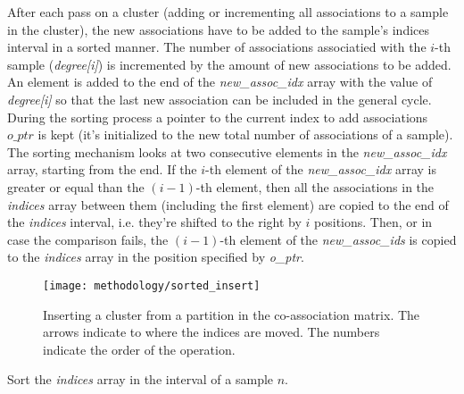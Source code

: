 After each pass on a cluster (adding or incrementing all associations to a sample in the cluster), the new associations have to be added to the sample's indices interval in a sorted manner.
The number of associations associatied with the $i$-th sample (\emph{degree[i]}) is incremented by the amount of new associations to be added.
An element is added to the end of the \emph{new\_assoc\_idx} array with the value of \emph{degree[i]} so that the last new association can be included in the general cycle.
During the sorting process a pointer to the current index to add associations $o\_ptr$ is kept (it's initialized to the new total number of associations of a sample).
The sorting mechanism looks at two consecutive elements in the \emph{new\_assoc\_idx} array, starting from the end.
If the $i$-th element of the \emph{new\_assoc\_idx} array is greater or equal than the $(i-1)$-th element, then all the associations in the \emph{indices} array between them (including the first element) are copied to the end of the \emph{indices} interval, i.e. they're shifted to the right by $i$ positions.
Then, or in case the comparison fails, the $(i-1)$-th element of the \emph{new\_assoc\_ids} is copied to the \emph{indices} array in the position specified by \emph{o\_ptr}.


\begin{figure}[hbtp]
\centering
\texttt{[image: methodology/sorted\_insert]}
\caption{Inserting a cluster from a partition in the co-association matrix. The arrows indicate to where the indices are moved. The numbers indicate the order of the operation.}
\label{fig:normal part}
\end{figure}



\begin{algorithm}
\caption{Sort the \emph{indices} array in the interval of a sample $n$.}\label{alg:eac csr sort cluster}
\begin{algorithmic}[1]

    \EndWhile
\EndWhile

\EndProcedure
\end{algorithmic}
\end{algorithm}

